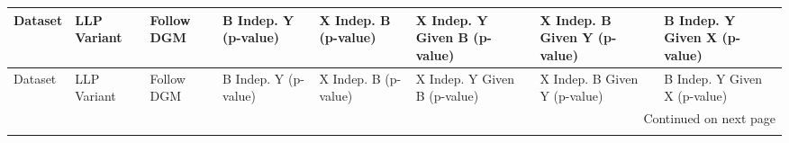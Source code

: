 \begin{longtable}{llllllll}
\toprule
                                                                                                      Dataset &  LLP Variant &  Follow DGM & B Indep. Y (p-value) & X Indep. B (p-value) & X Indep. Y Given B (p-value) & X Indep. B Given Y (p-value) & B Indep. Y Given X (p-value) \\
\midrule
\endfirsthead

\toprule
                                                                                                      Dataset &  LLP Variant &  Follow DGM & B Indep. Y (p-value) & X Indep. B (p-value) & X Indep. Y Given B (p-value) & X Indep. B Given Y (p-value) & B Indep. Y Given X (p-value) \\
\midrule
\endhead
\midrule
\multicolumn{8}{r}{{Continued on next page}} \\
\midrule
\endfoot


\end{longtable}

